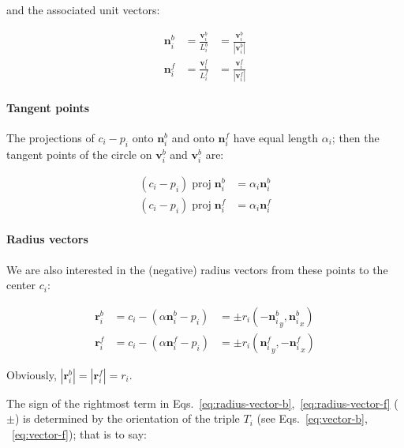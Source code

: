 \documentclass{article}
\begin{document}
and the associated unit vectors:

\begin{align}
  \label{eq:unit-vector-b}
  \mathbf{n}^{b}_{i} &= \frac{\mathbf{v}^{b}_{i}}{L^{b}_{i}} &=\frac{\mathbf{v}^{b}_{i}}{\left|\mathbf{v}^{b}_{i}\right|}\\
  \label{eq:unit-vectors-f}
  \mathbf{n}^{f}_{i} &= \frac{\mathbf{v}^{f}_{i}}{L^{f}_{i}} &=\frac{\mathbf{v}^{f}_{i}}{\left|\mathbf{v}^{f}_{i}\right|}
\end{align}

\paragraph{Tangent points}

The projections of $c_{i}-p_{i}$ onto $\mathbf{n}^{b}_{i}$ and onto $\mathbf{n}^{f}_{i}$ have equal length $\alpha_i$; then the tangent points of the circle on $\mathbf{v}^{b}_{i}$ and $\mathbf{v}^{b}_{i}$ are:

\begin{align}
  \label{eq:alpha-vector-b}
  \left(c_{i}-p_{i}\right)\;\mathrm{proj}\; \mathbf{n}^{b}_{i} &= \alpha_i\mathbf{n}^{b}_{i}\\
  \label{eq:alpha-vector-f}
  \left(c_{i}-p_{i}\right)\;\mathrm{proj}\; \mathbf{n}^{f}_{i} &= \alpha_i\mathbf{n}^{f}_{i}
\end{align}

\paragraph{Radius vectors}

We are also interested in the (negative) radius vectors from these points to the center $c_{i}$:

\begin{align}
  \label{eq:radius-vector-b}
  \mathbf{r}^{b}_{i} &= c_{i} - \left(\alpha\mathbf{n}^{b}_{i} - p_{i}\right)&=\pm r_i\left( -{\mathbf{n}^{b}_{i}}_{y},  {\mathbf{n}^{b}_{i}}_{x} \right)\\
  \label{eq:radius-vector-f}
  \mathbf{r}^{f}_{i} &= c_{i} - \left(\alpha\mathbf{n}^{f}_{i} - p_{i}\right)&=\pm r_i\left(  {\mathbf{n}^{f}_{i}}_{y}, -{\mathbf{n}^{f}_{i}}_{x} \right)
\end{align}

Obviously, $\left|\mathbf{r}^{b}_{i}\right| = \left|\mathbf{r}^{f}_{i}\right| = r_{i}$.

The sign of the rightmost term in Eqs.~\eqref{eq:radius-vector-b},~\eqref{eq:radius-vector-f} ($\pm$) is determined by the orientation of the triple $T_i$ (see Eqs.~\eqref{eq:vector-b}, ~\eqref{eq:vector-f}); that is to say:
\end{document}
